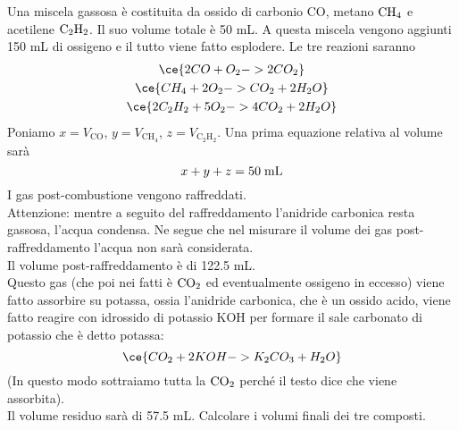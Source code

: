 \begin{esercizio}[$\bigstar$]
    Una miscela gassosa è costituita da ossido di carbonio CO, metano $\rm CH_4$ e acetilene $\rm C_2H_2$. Il suo volume totale è 50 mL. A questa miscela vengono aggiunti 150 mL di ossigeno e il tutto viene fatto esplodere\footnotemark. Le tre reazioni saranno
    \begin{gather*}
        \ce{2CO + O_2 -> 2CO_2}
        \\
        \ce{CH_4 + 2O_2 -> CO_2 + 2H_2O}
        \\
        \ce{2C_2H_2 + 5O_2 -> 4CO_2 + 2H_2O}
    \end{gather*}
    Poniamo $x=V_{\text{CO}}$, $y=V_{\text{CH}_4}$, $z=V_{\text{C}_2\text{H}_2}$. Una prima equazione relativa al volume sarà
    \begin{equation*}
        x+y+z=50 \; \rm mL
    \end{equation*}
    I gas post-combustione vengono raffreddati.\\
    Attenzione: mentre a seguito del raffreddamento l'anidride carbonica resta gassosa, l'acqua condensa. Ne segue che nel misurare il volume dei gas post-raffreddamento l'acqua non sarà considerata.\\
    Il volume post-raffreddamento è di 122.5 mL.\\
    Questo gas (che poi nei fatti è $\rm CO_2$ ed eventualmente ossigeno in eccesso) viene fatto assorbire su potassa, ossia l'anidride carbonica, che è un ossido acido, viene fatto reagire con idrossido di potassio KOH per formare il sale carbonato di potassio che è detto potassa:
    \begin{equation*}
        \ce{CO_2 + 2KOH -> K_2CO_3 + H_2O}
    \end{equation*}
    (In questo modo sottraiamo tutta la $\rm CO_2$ perché il testo dice che viene assorbita).\\
    Il volume residuo sarà di 57.5 mL. Calcolare i volumi finali dei tre composti.
\end{esercizio}
